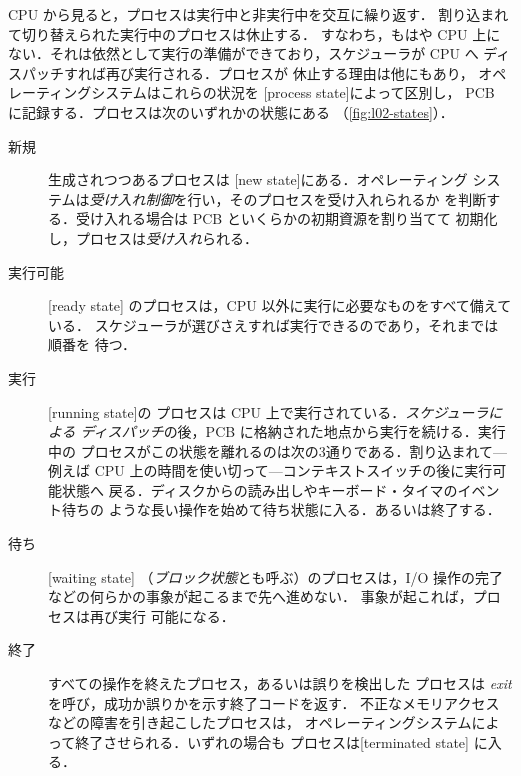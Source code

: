 \documentclass[../main.tex]{subfiles}
\begin{document}
CPU から見ると，プロセスは実行中と非実行中を交互に繰り返す．
割り込まれて切り替えられた実行中のプロセスは休止する．
すなわち，もはや CPU 上にない．それは依然として実行の準備ができており，スケジューラが CPU へ
ディスパッチすれば再び実行される．プロセスが
休止する理由は他にもあり，
オペレーティングシステムはこれらの状況を
[process state]によって区別し，
PCB に記録する．プロセスは次のいずれかの状態にある
（\cref{fig:l02-states}）．

\begin{description}
  \item[新規] 生成されつつあるプロセスは
    [new state]にある．オペレーティング
    システムは\emph{受け入れ制御}を行い，そのプロセスを受け入れられるか
    を判断する．受け入れる場合は PCB といくらかの初期資源を割り当てて
    初期化し，プロセスは\emph{受け入れ}られる．
  \item[実行可能] [ready state]%
    のプロセスは，CPU 以外に実行に必要なものをすべて備えている．
    スケジューラが選びさえすれば実行できるのであり，それまでは順番を
    待つ．
  \item[実行] [running state]の
    プロセスは CPU 上で実行されている．\emph{スケジューラによる
    ディスパッチ}の後，PCB に格納された地点から実行を続ける．実行中の
    プロセスがこの状態を離れるのは次の3通りである．割り込まれて---例えば CPU
    上の時間を使い切って---コンテキストスイッチの後に実行可能状態へ
    戻る．ディスクからの読み出しやキーボード・タイマのイベント待ちの
    ような長い操作を始めて待ち状態に入る．あるいは終了する．
  \item[待ち] [waiting state]
    （\emph{ブロック状態}とも呼ぶ）のプロセスは，I/O 操作の完了などの何らかの事象が起こるまで先へ進めない．%
    事象が起これば，プロセスは再び実行
    可能になる．
  \item[終了] すべての操作を終えたプロセス，あるいは誤りを検出した
    プロセスは \emph{exit} を呼び，成功か誤りかを示す終了コードを返す．
    不正なメモリアクセスなどの障害を引き起こしたプロセスは，
    オペレーティングシステムによって終了させられる．いずれの場合も
    プロセスは[terminated state]%
    に入る．
\end{description}
\end{document}
